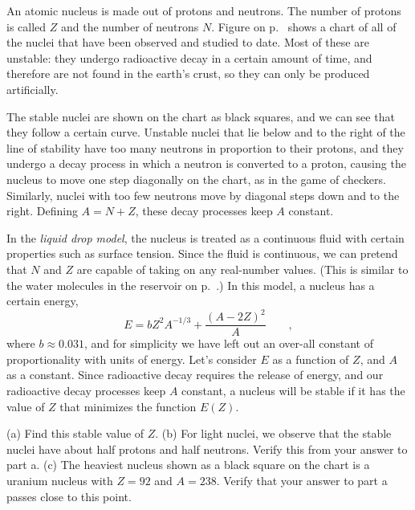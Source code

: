 An atomic nucleus is made out of protons and neutrons. The number of protons
is called $Z$ and the number of neutrons $N$. Figure 
on p.~\pageref{fig:hw-line-of-stability} shows a chart of all of the nuclei that have
been observed and studied to date. Most of these are unstable: they undergo radioactive
decay in a certain amount of time, and therefore are not found in the earth's crust,
so they can only be produced artificially.

The stable nuclei are shown on the chart
as black squares, and we can see that they follow a certain curve. Unstable nuclei
that lie below and to the right of the line of stability have too many neutrons in
proportion to their protons, and they undergo a decay process in which a neutron
is converted to a proton, causing the nucleus to move one step diagonally on the
chart, as in the game of checkers. Similarly, nuclei with too few neutrons move
by diagonal steps down and to the right. Defining $A=N+Z$, these decay processes keep
$A$ constant.

In the \emph{liquid drop model}, the nucleus is treated as a continuous fluid with
certain properties such as surface tension. Since the fluid is continuous, we can
pretend that $N$ and $Z$ are capable of taking on any real-number values. (This is similar to
the water molecules in the reservoir on p.~\pageref{fig:reservoir}.) In this model,
a nucleus has a certain energy,
\begin{equation*}
  E = bZ^2A^{-1/3}+\frac{(A-2Z)^2}{A} \qquad ,
\end{equation*}
where $b\approx0.031$, and for simplicity we have left out
an over-all constant of proportionality with units of energy.
Let's consider $E$ as a function of $Z$, and $A$ as a constant.
Since radioactive decay requires the release of energy, and our radioactive decay
processes keep $A$ constant, a nucleus will be stable if it has the value
of $Z$ that minimizes the function $E(Z)$.

(a) Find this stable value of $Z$.\answercheck\hwendpart
(b) For light nuclei, we observe that the stable nuclei have about half protons and
half neutrons. Verify this from your answer to part a.\hwendpart
(c) The heaviest nucleus shown as a black square on the chart is a uranium nucleus
with $Z=92$ and $A=238$. Verify that your answer to part a passes close to this point.
